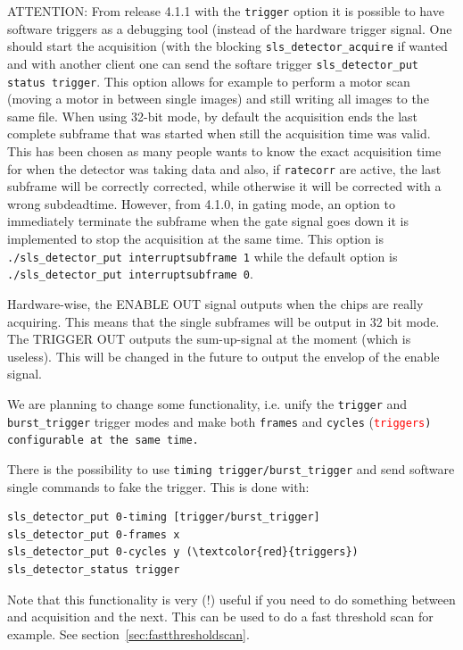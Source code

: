 \documentclass{article}
\begin{document}
{{{\begin{itemize}
ATTENTION: From release 4.1.1 with the {\tt{trigger}} option it is possible to have software triggers as a debugging tool (instead of the hardware trigger signal. One should start the acquisition (with the blocking {\tt{sls\_detector\_acquire}} if wanted and with another client one can send the softare trigger {\tt{sls\_detector\_put status trigger}}. This option allows for example to perform a motor scan (moving a motor in between single images) and still writing all images to the same file. 
When using 32-bit mode, by default the acquisition ends the last complete subframe that was started when still the acquisition time was valid. This has been chosen as many people wants to know the exact acquisition time for when the detector was taking data and also, if {\tt{ratecorr}} are active, the last subframe will be correctly corrected, while otherwise it will be corrected with a wrong subdeadtime. 
However, from 4.1.0, in gating mode, an option to immediately terminate the subframe when the gate signal goes down it is implemented to stop the acquisition at the same time.  This option is {\tt{./sls\_detector\_put interruptsubframe 1}} while the default option is {\tt{./sls\_detector\_put interruptsubframe 0}}.  

\end{itemize}

Hardware-wise, the ENABLE OUT signal outputs when the chips are really acquiring. This means that the single subframes will be output in 32 bit mode. The TRIGGER OUT outputs the sum-up-signal at the moment (which is useless). This will be changed in the future to output the envelop of the enable signal. 

We are planning to change some functionality, i.e. unify the {\tt{trigger}} and {\tt{burst\_trigger}} trigger modes and make both {\tt{frames}} and {\tt{cycles}} (\tt{\textcolor{red}{triggers}}) configurable at the same time.

There is the possibility to use {\tt{timing trigger/burst\_trigger}} and send software single commands to fake the trigger. This is done with:
\begin{verbatim}
sls_detector_put 0-timing [trigger/burst_trigger]
sls_detector_put 0-frames x
sls_detector_put 0-cycles y (\textcolor{red}{triggers})
sls_detector_status trigger
\end{verbatim}
 Note that this functionality is very (!) useful if you need to do something between and acquisition and the next. This can be used to do a fast threshold scan for example. See section~\ref{sec:fastthresholdscan}.


}}}
\end{document}
